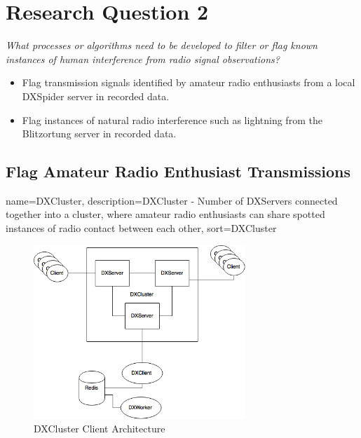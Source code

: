 \documentclass[runningheads,a4paper]{llncs}
\begin{document}
%
%
\chapter*{Research Question 2}

\textit{What processes or algorithms need to be developed to filter or flag known instances of human interference from radio signal observations?}

\begin{itemize}
	\item Flag transmission signals identified by amateur radio enthusiasts from a local DXSpider server in recorded data.
  	\item Flag instances of natural radio interference such as lightning from the Blitzortung server in recorded data.
\end{itemize}

\section*{Flag Amateur Radio Enthusiast Transmissions}

{
	name={DXCluster},
	description={DXCluster - Number of DXServers connected together into a cluster, where amateur radio enthusiasts can share spotted instances of radio contact between each other},
	sort=DXCluster
}

%
\begin{figure}[!htb]
	\centering
	\includegraphics[width=8cm]{images/72}
	\caption{DXCluster Client Architecture}
	\label{fig:dxcluster_client_architecture}
\end{figure}
%
\end{document}
